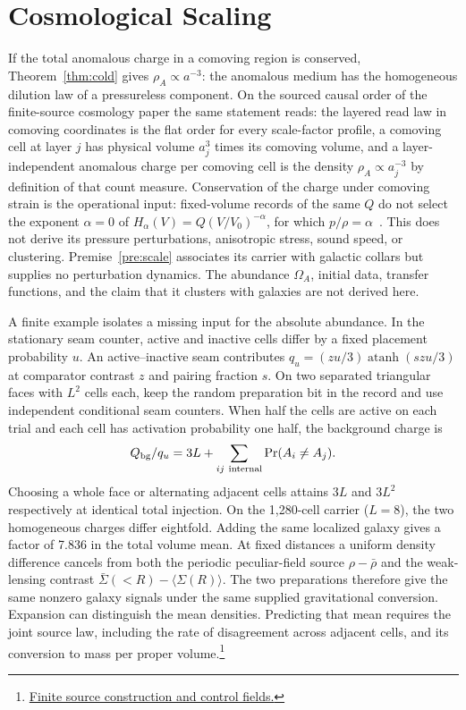 \documentclass[11pt]{article}
\begin{document}
\section{Cosmological Scaling}
\label{sec:cosmo}

If the total anomalous charge in a comoving region is conserved,
Theorem~\ref{thm:cold} gives \(\rho_A\propto a^{-3}\): the anomalous medium
has the homogeneous dilution law of a pressureless component. On the
sourced causal order of the finite-source cosmology paper the same statement
reads: the layered read law in comoving coordinates is the flat order for
every scale-factor profile, a comoving cell at layer \(j\) has physical
volume \(a_j^3\) times its comoving volume, and a layer-independent
anomalous charge per comoving cell is the density \(\rho_A\propto a_j^{-3}\)
by definition of that count measure. Conservation of the charge under comoving
strain is the operational input: fixed-volume records of the same \(Q\) do not
select the exponent \(\alpha=0\) of \(H_\alpha(V)=Q(V/V_0)^{-\alpha}\), for which
\(p/\rho=\alpha\)~\cite{ophobservers}.
This does not
derive its pressure perturbations, anisotropic stress, sound speed, or
clustering. Premise~\ref{pre:scale} associates its carrier with galactic
collars but supplies no perturbation dynamics. The abundance \(\Omega_A\),
initial data, transfer functions, and the claim that it clusters with galaxies are not derived here.

A finite example isolates a missing input for the absolute abundance.
In the stationary seam counter, active and inactive cells differ by a fixed
placement probability $u$. An active--inactive seam contributes
$q_u=(zu/3)\operatorname{atanh}(szu/3)$ at comparator contrast $z$ and
pairing fraction $s$. On two separated triangular faces with $L^2$ cells
each, keep the random preparation bit in the record and use independent
conditional seam counters. When half the cells are active on each trial
and each cell has activation probability one half, the background charge is
\[
 Q_{\rm bg}/q_u=3L+\sum_{ij\ {\rm internal}}\Pr(A_i\ne A_j).
\]
Choosing a whole face or alternating adjacent cells attains $3L$ and
$3L^2$ respectively at identical total injection. On the 1,280-cell
carrier ($L=8$), the two homogeneous charges differ eightfold. Adding
the same localized galaxy gives a factor of 7.836 in the total volume
mean. At fixed distances a uniform density difference cancels from both
the periodic peculiar-field source $\rho-\bar\rho$ and the weak-lensing
contrast $\bar\Sigma(<R)-\langle\Sigma(R)\rangle$. The two preparations
therefore give the same nonzero galaxy signals under the same supplied
gravitational conversion. Expansion can distinguish the mean densities.
Predicting that mean requires the joint source law, including the rate of
disagreement across adjacent cells, and its conversion to mass per proper
volume.\footnote{\href{https://github.com/FloatingPragma/observer-patch-holography/tree/main/code/cosmology/record_abundance}{Finite source construction and control fields.}}
\end{document}
